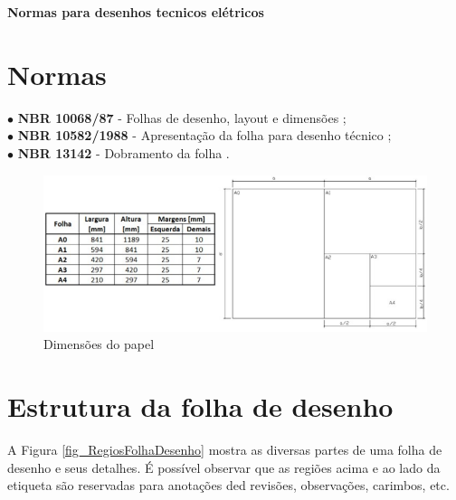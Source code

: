 \documentclass{article}
\begin{document}
\thispagestyle{empty} %


\begin{center}
\textbf{\Large{Normas para desenhos tecnicos elétricos}}    
\end{center}

\vspace{0.5cm}

\section{Normas}

$\bullet$ \hspace{0.2cm} \textbf{NBR 10068/87} - Folhas de desenho, layout e dimensões {\color{blue}\cite{NBR10068:1987}};\\
$\bullet$ \hspace{0.2cm} \textbf{NBR 10582/1988} - Apresentação da folha para desenho técnico {\color{blue}\cite{NBR10582:1988}};\\
$\bullet$ \hspace{0.2cm} \textbf{NBR 13142} - Dobramento da folha {\color{blue}\cite{NBR13142:1999}}.\\

\begin{figure} [H] %
\centering
\includegraphics[scale=0.65]{Fig/Figura_DimensoesDoPapel.png} 
\caption{Dimensões do papel}
\label{fig_DimensPapel}
\end{figure}

\section{Estrutura da folha de desenho}

\hspace{1cm} A Figura \ref{fig_RegiosFolhaDesenho} mostra as diversas partes de uma folha de desenho e seus detalhes. É possível observar que as regiões acima e ao lado da etiqueta são reservadas para anotações ded revisões, observações, carimbos, etc.
\end{document}
